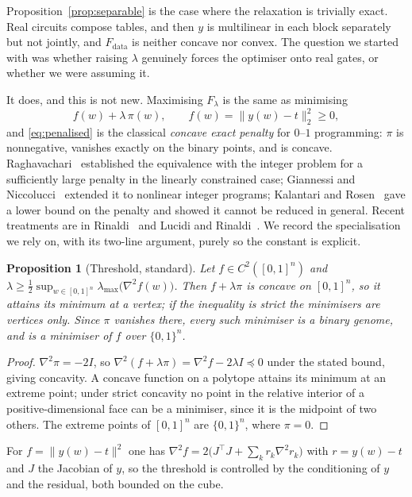 \documentclass[11pt,a4paper]{article}
\newtheorem{proposition}{Proposition}
\begin{document}
Proposition~\ref{prop:separable} is the case where the relaxation is trivially
exact. Real circuits compose tables, and then $y$ is multilinear in each block
separately but not jointly, and $F_{\mathrm{data}}$ is neither concave nor convex.
The question we started with was whether raising $\lambda$ genuinely forces the
optimiser onto real gates, or whether we were assuming it.

It does, and this is not new. Maximising $F_\lambda$ is the same as minimising
\begin{equation}
  f(w) + \lambda\,\pi(w), \qquad f(w) = \lVert y(w)-t\rVert_2^2 \ge 0,
  \label{eq:penalised}
\end{equation}
and \eqref{eq:penalised} is the classical \emph{concave exact penalty} for $0$--$1$
programming: $\pi$ is nonnegative, vanishes exactly on the binary points, and is
concave. Raghavachari~\cite{raghavachari} established the equivalence with the
integer problem for a sufficiently large penalty in the linearly constrained case;
Giannessi and Niccolucci~\cite{giannessi} extended it to nonlinear integer
programs; Kalantari and Rosen~\cite{kalantari} gave a lower bound on the penalty
and showed it cannot be reduced in general. Recent treatments are in
Rinaldi~\cite{rinaldi} and Lucidi and Rinaldi~\cite{lucidi}. We record the
specialisation we rely on, with its two-line argument, purely so the constant is
explicit.

\begin{proposition}[Threshold, standard]
\label{prop:threshold}
Let $f\in C^2([0,1]^n)$ and $\lambda \ge \tfrac12\sup_{w\in[0,1]^n}
\lambda_{\max}\!\bigl(\nabla^2 f(w)\bigr)$. Then $f+\lambda\pi$ is concave on
$[0,1]^n$, so it attains its minimum at a vertex; if the inequality is strict the
minimisers are vertices only. Since $\pi$ vanishes there, every such minimiser is
a binary genome, and is a minimiser of $f$ over $\{0,1\}^n$.
\end{proposition}

\begin{proof}
$\nabla^2\pi=-2I$, so $\nabla^2(f+\lambda\pi)=\nabla^2 f-2\lambda I\preceq 0$
under the stated bound, giving concavity. A concave function on a polytope attains
its minimum at an extreme point; under strict concavity no point in the relative
interior of a positive-dimensional face can be a minimiser, since it is the
midpoint of two others. The extreme points of $[0,1]^n$ are $\{0,1\}^n$, where
$\pi=0$.
\end{proof}

For $f=\lVert y(w)-t\rVert^2$ one has
$\nabla^2 f = 2\bigl(J^\top J + \sum_k r_k \nabla^2 r_k\bigr)$ with $r=y(w)-t$ and
$J$ the Jacobian of $y$, so the threshold is controlled by the conditioning of $y$
and the residual, both bounded on the cube.
\end{document}
